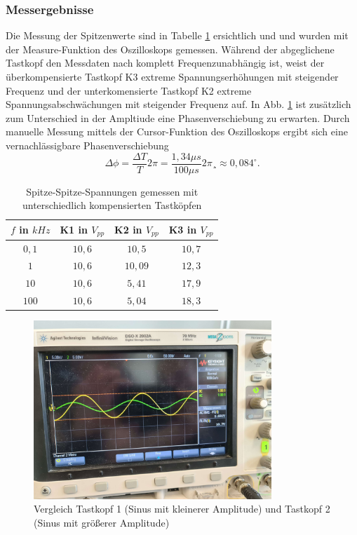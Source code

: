 \documentclass[a4paper]{article}
\begin{document}
\subsubsection{Messergebnisse}
Die Messung der Spitzenwerte sind in Tabelle \ref{tab:4a_Vpp} ersichtlich und
und wurden mit der Measure-Funktion des Oszilloskops gemessen. Während der
abgeglichene Tastkopf den Messdaten nach komplett Frequenzunabhängig ist, weist
der überkompensierte Tastkopf K3 extreme Spannungserhöhungen mit steigender
Frequenz und der unterkomensierte Tastkopf K2 extreme Spannungsabschwächungen
mit steigender Frequenz auf.\newline
In Abb. \ref{fig:4b_VergleichK1K2} ist zusätzlich zum Unterschied in der Ampltiude
eine Phasenverschiebung zu erwarten. Durch manuelle Messung mittels der
Cursor-Funktion des Oszilloskops ergibt sich eine vernachlässigbare Phasenverschiebung
\[ \Delta \phi=\frac{\Delta T}{T}2\pi=\frac{1,34 \unit{\mu s}}{100 \unit{\mu s}}2\pi¸\approx 0,084^\circ .\]


\begin{table}[h]
    \centering
    \caption{Spitze-Spitze-Spannungen gemessen mit unterschiedlich kompensierten Tastköpfen}
    \label{tab:4a_Vpp}
    \begin{tabular}{|c|c|c|c|}
        \hline
        $f$ in $\unit{kHz}$& K1 in $V_{pp}$ & K2 in $V_{pp}$& K3 in $V_{pp}$\\ 
     \hline
        $0,1$ & $10,6$ & $10,5$& $10,7$ \\
        $1  $ & $10,6$ & $10,09$& $12,3$  \\
        $10 $ & $10,6$ & $5,41$& $17,9$ \\
        $100$ & $10,6$ & $5,04$& $18,3$ \\
        \hline
    \end{tabular}
\end{table}
\begin{figure}[h]
    \centering
    \includegraphics[width=0.8\textwidth]{images/Oszi - Sinus.jpg}
    \caption{Vergleich Tastkopf 1 (Sinus mit kleinerer Amplitude) und Tastkopf 2 (Sinus mit größerer Amplitude)}
    \label{fig:4b_VergleichK1K2}
\end{figure}
\end{document}
